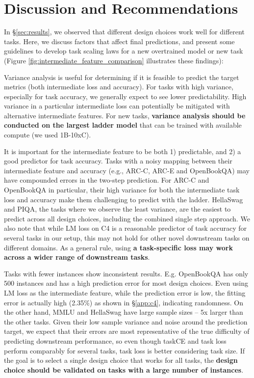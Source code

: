 \section{Discussion and Recommendations}
\label{sec:ablations}


In \S\ref{sec:results}, we observed that different design choices work well for different tasks. Here, we discuss factors that affect final predictions, and present some guidelines to develop task scaling laws for a new overtrained model or new task (Figure \ref{fig:intermediate_feature_comparison} illustrates these findings):

Variance analysis is useful for determining if it is feasible to predict the target metrics (both intermediate loss and accuracy). For tasks with high variance, especially for task accuracy, we generally expect to see lower predictability. High variance in a particular intermediate loss can potentially be mitigated with alternative intermediate features. For new tasks, \textbf{variance analysis should be conducted on the largest ladder model} that can be trained with available compute (we used 1B-10xC). 

It is important for the intermediate feature to be both 1) predictable, and 2) a good predictor for task accuracy. Tasks with a noisy mapping between their intermediate feature and accuracy (e.g., ARC-C, ARC-E and OpenBookQA) may have compounded errors in the two-step prediction. For ARC-C and OpenBookQA in particular, their high variance for both the intermediate task loss and accuracy make them challenging to predict with the ladder.
HellaSwag and PIQA, the tasks where we observe the least variance, are the easiest to predict across all design choices, including the combined single step approach. 
We also note that while LM loss on C4 is a reasonable predictor of task accuracy for several tasks in our setup, this may not hold for other novel downstream tasks on different domains. As a general rule, using \textbf{a task-specific loss may work across a wider range of downstream tasks}.

Tasks with fewer instances show inconsistent results. E.g. OpenBookQA has only 500 instances and  has a high prediction error for most design choices. Even using LM loss as the intermediate feature, while the prediction error is low, the fitting error is actually high (2.35\%) as shown in \S\ref{app:c4}, indicating randomness. On the other hand, MMLU and HellaSwag have large sample sizes – 5x larger than the other tasks. Given their low sample variance and noise around the prediction target, we expect that their errors are most representative of the true difficulty of predicting downstream performance, so even though taskCE and task loss perform comparably for several tasks, task loss is better considering task size. If the goal is to select a single design choice that works for all tasks, the \textbf{design choice should be validated on tasks with a large number of instances}.

